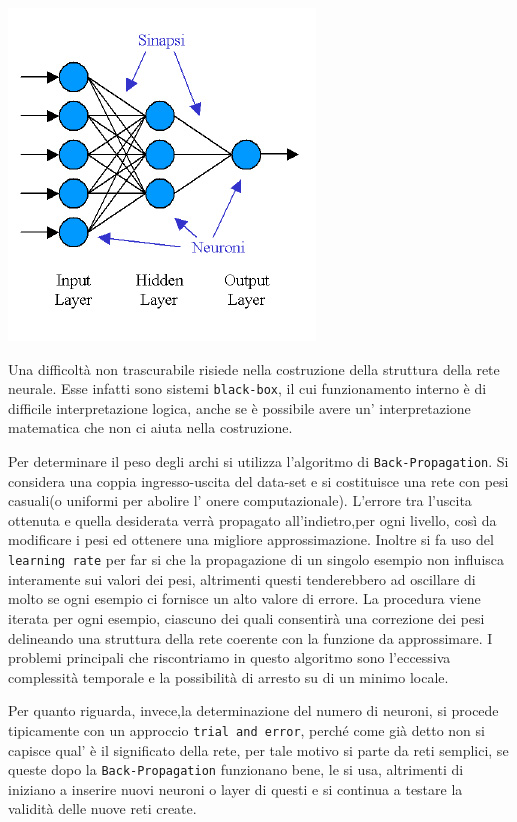 			\begin{center}
				\includegraphics[scale=0.6]{RN-multilayer.jpg}
			\end{center}
			\par
			Una difficoltà non trascurabile risiede nella costruzione della struttura della rete neurale. Esse infatti sono sistemi \texttt{black-box}, il cui funzionamento interno è di difficile interpretazione logica, anche se è possibile avere un' interpretazione matematica che non ci aiuta nella costruzione.\par
			Per determinare il peso degli archi si utilizza l'algoritmo di \texttt{Back-Propagation}. Si considera una coppia ingresso-uscita del data-set e si costituisce una rete con pesi casuali(o uniformi per abolire l' onere computazionale). L'errore tra l'uscita ottenuta e quella desiderata verrà propagato all'indietro,per ogni  livello, così da modificare i pesi ed ottenere una migliore approssimazione. Inoltre si fa uso del \texttt{learning rate} per far si che la propagazione di un singolo esempio non influisca interamente sui valori dei pesi, altrimenti questi tenderebbero ad oscillare di molto se ogni esempio ci fornisce un alto valore di errore. La procedura viene iterata per ogni esempio, ciascuno dei quali consentirà una correzione dei pesi delineando una struttura della rete coerente con la funzione da approssimare. I problemi principali che riscontriamo in questo algoritmo sono l'eccessiva complessità temporale e la possibilità di arresto su di un minimo locale.\par
			Per quanto riguarda, invece,la determinazione del numero di neuroni, si procede tipicamente con un approccio \texttt{trial and error}, perché come già detto non si capisce qual' è il significato della rete, per tale motivo si parte da reti semplici, se queste dopo la \texttt{Back-Propagation} funzionano bene, le si usa, altrimenti di iniziano a inserire nuovi neuroni o layer di questi e si continua a testare la validità delle nuove reti create.\par
